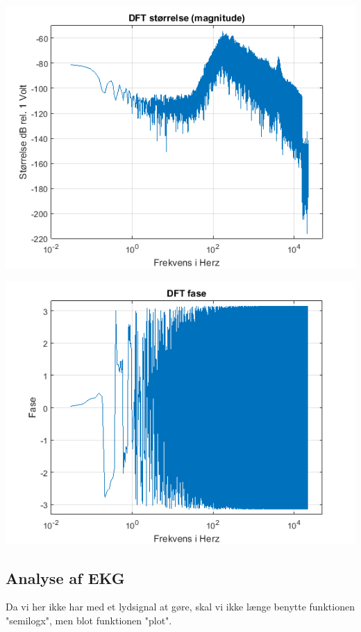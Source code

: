 \documentclass[12pt, letterpaper]{article}
\begin{document}
\begin{center}
\includegraphics[width=\textwidth]{billeder/vindstorrelse}
\end{center}

\begin{center}
\includegraphics[width=\textwidth]{billeder/vindfase}
\end{center}

\subsection{Analyse af EKG}
Da vi her ikke har med et lydsignal at gøre, skal vi ikke længe benytte funktionen "semilogx", men blot funktionen "plot".
\end{document}
